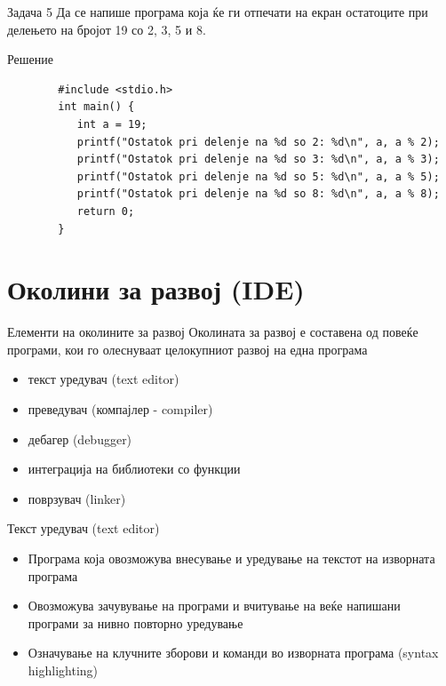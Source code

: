 \begin{frame}[fragile]{Задача 5}
Да се напише програма која ќе ги отпечати на екран остатоците при делењето на бројот 19 со 2, 3, 5 и 8.
	\begin{exampleblock}{Решение}
		\begin{lstlisting}
		#include <stdio.h>
		int main() {
		   int a = 19;
		   printf("Ostatok pri delenje na %d so 2: %d\n", a, a % 2);
		   printf("Ostatok pri delenje na %d so 3: %d\n", a, a % 3);
		   printf("Ostatok pri delenje na %d so 5: %d\n", a, a % 5);
		   printf("Ostatok pri delenje na %d so 8: %d\n", a, a % 8);
		   return 0;
		}
		\end{lstlisting}
	\end{exampleblock}
\end{frame}

\section{Околини за развој (IDE)}

\begin{frame}{Елементи на околините за развој}
Околината за развој е составена од повеќе програми, кои го олеснуваат
целокупниот развој на една програма
\begin{itemize}
  \item текст уредувач (text editor)
  \item преведувач (компајлер - compiler)
  \item дебагер (debugger)
  \item интеграција на библиотеки со функции
  \item поврзувач (linker)
\end{itemize}
\end{frame}

\begin{frame}{Текст уредувач (text editor)}
\begin{itemize}
  \item Програма која овозможува внесување и уредување на текстот на изворната
  програма
  \item Овозможува зачувување на програми и вчитување на веќе напишани програми
  за нивно повторно уредување 
  \item Означување на клучните зборови и команди во изворната програма (syntax
  highlighting)
\end{itemize}
\end{frame}


